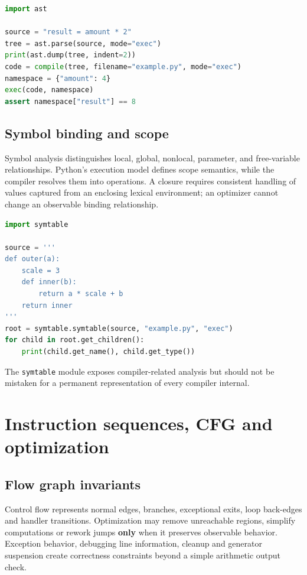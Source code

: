 \documentclass[
  11pt,
]{report}
\newcommand{\passthrough}[1]{#1}
\begin{document}
\begin{lstlisting}[language=Python]
import ast

source = "result = amount * 2"
tree = ast.parse(source, mode="exec")
print(ast.dump(tree, indent=2))
code = compile(tree, filename="example.py", mode="exec")
namespace = {"amount": 4}
exec(code, namespace)
assert namespace["result"] == 8
\end{lstlisting}

\section{Symbol binding and scope}\label{symbol-binding-and-scope}

Symbol analysis distinguishes local, global, nonlocal, parameter, and
free-variable relationships. Python's execution model defines scope
semantics, while the compiler resolves them into operations. A closure
requires consistent handling of values captured from an enclosing
lexical environment; an optimizer cannot change an observable binding
relationship.

\begin{lstlisting}[language=Python]
import symtable

source = '''
def outer(a):
    scale = 3
    def inner(b):
        return a * scale + b
    return inner
'''
root = symtable.symtable(source, "example.py", "exec")
for child in root.get_children():
    print(child.get_name(), child.get_type())
\end{lstlisting}

The \passthrough{\lstinline!symtable!} module exposes compiler-related
analysis but should not be mistaken for a permanent representation of
every compiler internal.

\chapter{Instruction sequences, CFG and
optimization}\label{instruction-sequences-cfg-and-optimization}

\section{Flow graph invariants}\label{flow-graph-invariants}

Control flow represents normal edges, branches, exceptional exits, loop
back-edges and handler transitions. Optimization may remove unreachable
regions, simplify computations or rework jumps \textbf{only} when it
preserves observable behavior. Exception behavior, debugging line
information, cleanup and generator suspension create correctness
constraints beyond a simple arithmetic output check.
\end{document}
